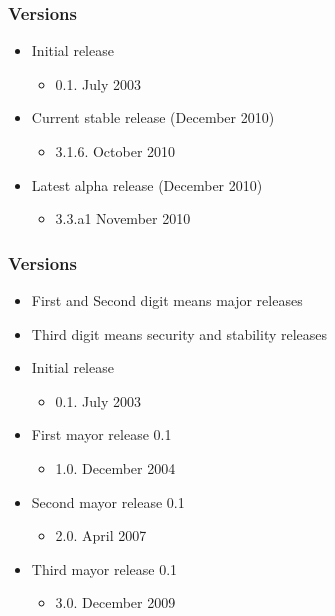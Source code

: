 \documentclass{beamer}
\begin{document}
\begin{frame}
 \frametitle{Versions}
 \begin{itemize}
 \item Initial release
    \begin{itemize}
     \item 0.1. July 2003
    \end{itemize}

 \item Current stable release (December 2010)
    \begin{itemize}
     \item 3.1.6. October 2010
    \end{itemize}

 \item Latest alpha release (December 2010)
    \begin{itemize}
     \item 3.3.a1 November 2010
    \end{itemize}

 \end{itemize}
\end{frame}


\begin{frame}
 \frametitle{Versions}
 \begin{itemize}
 \item First and Second digit means major releases
 \item Third digit means security and stability releases
 \item Initial release
    \begin{itemize}
     \item 0.1. July 2003
    \end{itemize}

 \item First mayor release 0.1
    \begin{itemize}
     \item 1.0. December 2004
    \end{itemize}

 \item Second mayor release 0.1
    \begin{itemize}
     \item 2.0. April 2007
    \end{itemize}

 \item Third mayor release 0.1
    \begin{itemize}
     \item 3.0. December 2009
    \end{itemize}

 \end{itemize}
\end{frame}
\end{document}
